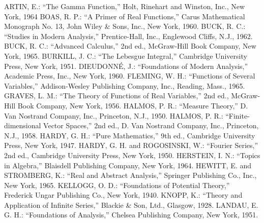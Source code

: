 

\begin{thebibliography}{A}

 ARTIN, E.: ``The Gamma Function,'' Holt, Rinehart and Winston, Inc., New York, 1964
 BOAS, R. P.: ``A Primer of Real Functions,'' Carus Mathematical Monograph No. 13, John Wiley \& Sons, Inc., New York, 1960.
 BUCK, R. C.: ``Studies in Modern Analysis,'' Prentice-Hall, Inc., Englewood Cliffs, N.J., 1962.
 BUCK, R. C.: ``Advanced Calculus,'' 2nd ed., McGraw-Hill Book Company, New York, 1965.
 BURKILL, J. C.: ``The Lebesgue Integral,'' Cambridge University Press, New York, 1951.
 DIEUDONN\'E, J.: ``Foundations of Modern Analysis,'' Academic Press, Inc., New York, 1960.
 FLEMING, W. H.: ``Functions of Several Variables,'' Addison-Wesley Publishing Company, Inc., Reading, Mass., 1965.
 GRAVES, L. M.: ``The Theory of Functions of Real Variables,'' 2nd ed., McGraw-Hill Book Company, New York, 1956.
 HALMOS, P. R.: ``Measure Theory,'' D. Van Nostrand Company, Inc., Princeton, N.J., 1950.
 HALMOS, P. R.: ``Finite-dimensional Vector Spaces,'' 2nd ed., D. Van Nostrand Company, Inc., Princeton, N.J., 1958.
 HARDY, G. H.: ``Pure Mathematics,'' 9th ed., Cambridge University Press, New York, 1947.
 HARDY, G. H. and ROGOSINSKI, W.: ``Fourier Series,'' 2nd ed., Cambridge University Press, New York, 1950.
 HERSTEIN, I. N.: ``Topics in Algebra,'' Blaisdell Publishing Company, New York, 1964.
 HEWITT, E. and STROMBERG, K.: ``Real and Abstract Analysis,'' Springer Publishing Co., Inc., New York, 1965.
 KELLOGG, O. D.: ``Foundations of Potential Theory,'' Frederick Ungar Publishing Co., New York, 1940.
 KNOPP, K.: ``Theory and Application of Infinite Series,'' Blackie \& Son, Ltd., Glasgow, 1928.
 LANDAU, E. G. H.: ``Foundations of Analysis,'' Chelsea Publishing Company, New York, 1951.

\end{thebibliography}
